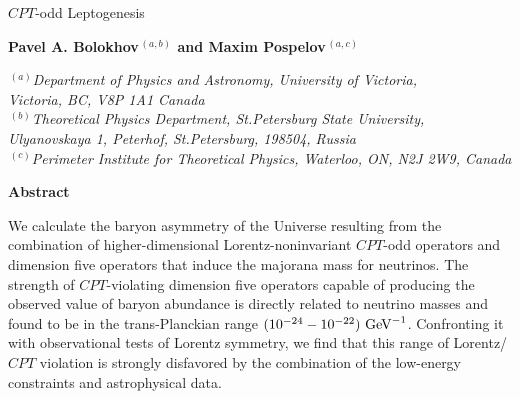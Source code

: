 \documentclass[12pt]{revtex4}
\begin{document}
\begin{titlepage}
\renewcommand{\thefootnote}{\fnsymbol{footnote}}

\setcounter{page}{1}

\vspace*{0.2in}

\begin{center}

\hspace*{-0.6cm}\parbox{17.5cm}{\Large \bf \begin{center}
$CPT$-odd Leptogenesis\end{center}}

\vspace*{0.5cm}
\normalsize


{\bf Pavel A. Bolokhov$^{\,(a,b)}$ and Maxim Pospelov$^{\,(a,c)}$ }



\smallskip
\medskip

$^{\,(a)}${\it Department of Physics and Astronomy, University of Victoria, \\
     Victoria, BC, V8P 1A1 Canada} \\
$^{\,(b)}${\it Theoretical Physics Department, St.Petersburg State University, Ulyanovskaya 1,
        Peterhof, St.Petersburg, 198504, Russia}\\
$^{\,(c)}${\it Perimeter Institute for Theoretical Physics, Waterloo,
ON, N2J 2W9, Canada}

\smallskip
\end{center}
\vskip0.2in


\centerline{\large\bf Abstract}

We calculate the baryon asymmetry of the Universe resulting from 
the combination of higher-dimensional Lorentz-noninvariant $CPT$-odd operators and 
dimension five operators that induce the majorana mass for neutrinos.
The strength of $CPT$-violating dimension five operators
capable of producing the observed value of baryon abundance is directly 
related to neutrino masses and found to be in 
the trans-Planckian range $(10^{-24}-10^{-22})~{\rm GeV}^{-1}$. Confronting it 
with observational tests of 
Lorentz symmetry, we find that this range of  Lorentz/$CPT$ violation 
 is strongly disfavored by the combination of the low-energy constraints and astrophysical 
data.  


\vfil
{}

\end{titlepage}


%
%
\end{document}
